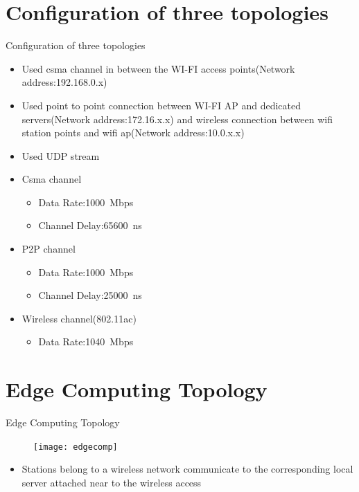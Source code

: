 \documentclass{beamer}
\begin{document}
\section{Configuration of three topologies}
\begin{frame}{Configuration of three topologies}
\begin{itemize}
	\item Used csma channel in between the WI-FI access points\big(Network address:192.168.0.x\big)
	\item Used point to point connection between WI-FI AP and dedicated servers\big(Network address:172.16.x.x\big) and wireless connection between wifi station points and wifi ap\big(Network address:10.0.x.x\big)
	\item Used UDP stream 
	\item Csma channel
	\begin{itemize}
		\item Data Rate:\SI{1000}Mbps
		\item Channel Delay:\SI{65600}{\nano\second}
	\end{itemize}
	\item P2P channel
	\begin{itemize}
		\item Data Rate:\SI{1000}Mbps
		\item Channel Delay:\SI{25000}{\nano\second}
	\end{itemize}
	\item Wireless channel\big(802.11ac\big)
	\begin{itemize}
		\item Data Rate:\SI{1040}Mbps
	\end{itemize}
	
\end{itemize}
\end{frame}
\section{Edge Computing Topology}

\begin{frame}{Edge Computing Topology}
\begin{figure}
\texttt{[image: edgecomp]}
\centering
\end{figure}

\begin{itemize} 
	\item Stations belong to a wireless network communicate to the corresponding local server attached near to the wireless access 
\end{itemize}

\end{frame}
\end{document}
